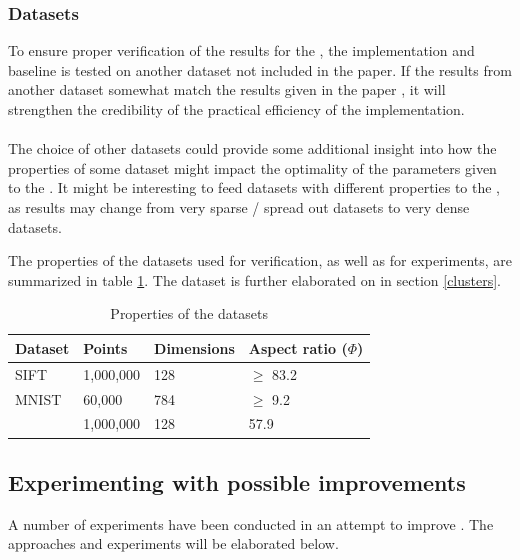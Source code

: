 \subsubsection{Datasets}
\label{datasets}
To ensure proper verification of the results for the \qs{}, the implementation and baseline is tested on another dataset not included in the paper. If the results from another dataset somewhat match the results given in the paper \cite{wagner17}, it will strengthen the credibility of the practical efficiency of the \qs{} implementation.
\\
\\
The choice of other datasets could provide some additional insight into how the properties of some dataset might impact the optimality of the parameters given to the \qs{}. It might be interesting to feed datasets with different properties to the \qs{}, as results may change from very sparse / spread out datasets to very dense datasets.

The properties of the datasets used for verification, as well as for experiments, are summarized in table \ref{tab:datasets}. The \clust{} dataset is further elaborated on in section \ref{clusters}.

\begin{table}[h]
	\centering
	\begin{tabular}{l l l l}
		\hline
		Dataset & Points & Dimensions & Aspect ratio ($\Phi$) \\
		\hline
		SIFT & 1,000,000 & 128 & $\geq$ 83.2 \\
		MNIST & 60,000 & 784 & $\geq$ 9.2 \\
		\clust{} & 1,000,000 & 128 & 57.9 \\
		\hline
	\end{tabular}
	\caption{Properties of the datasets}
	\label{tab:datasets}
\end{table}

\subsection{Experimenting with possible improvements}
\label{possible_improvements}
A number of experiments have been conducted in an attempt to improve \qs{}. The approaches and experiments will be elaborated below.
